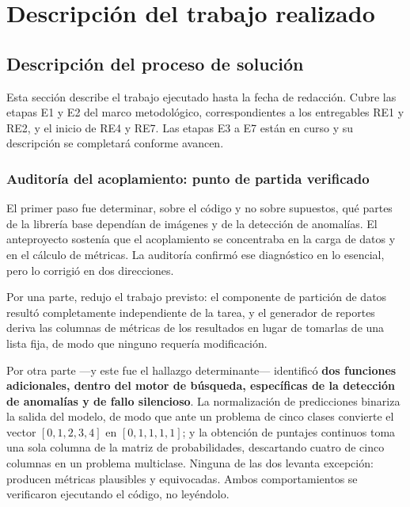\documentclass[12pt,letterpaper,oneside]{article}
\begin{document}
\clearpage
\section{Descripción del trabajo realizado}
\label{sec:trabajo-realizado}

\subsection{Descripción del proceso de solución}

Esta sección describe el trabajo ejecutado hasta la fecha de redacción. Cubre las etapas
E1 y E2 del marco metodológico, correspondientes a los entregables RE1 y RE2, y el inicio
de RE4 y RE7. Las etapas E3 a E7 están en curso y su descripción se completará conforme
avancen.

\subsubsection{Auditoría del acoplamiento: punto de partida verificado}

El primer paso fue determinar, sobre el código y no sobre supuestos, qué partes de la
librería base dependían de imágenes y de la detección de anomalías. El anteproyecto
sostenía que el acoplamiento se concentraba en la carga de datos y en el cálculo de
métricas. La auditoría confirmó ese diagnóstico en lo esencial, pero lo corrigió en dos
direcciones.

Por una parte, redujo el trabajo previsto: el componente de partición de datos resultó
completamente independiente de la tarea, y el generador de reportes deriva las columnas de
métricas de los resultados en lugar de tomarlas de una lista fija, de modo que ninguno
requería modificación.

Por otra parte —y este fue el hallazgo determinante— identificó \textbf{dos funciones
adicionales, dentro del motor de búsqueda, específicas de la detección de anomalías y de
fallo silencioso}. La normalización de predicciones binariza la salida del modelo, de modo
que ante un problema de cinco clases convierte el vector $[0,1,2,3,4]$ en $[0,1,1,1,1]$; y
la obtención de puntajes continuos toma una sola columna de la matriz de probabilidades,
descartando cuatro de cinco columnas en un problema multiclase. Ninguna de las dos levanta
excepción: producen métricas plausibles y equivocadas. Ambos comportamientos se verificaron
ejecutando el código, no leyéndolo.
\end{document}
